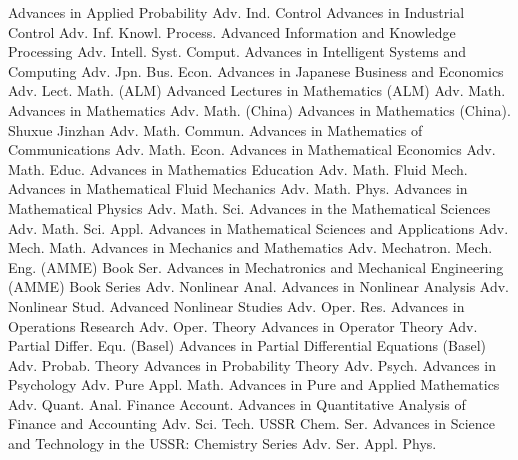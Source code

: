 {Advances in Applied Probability}
{Adv. Ind. Control}
{Advances in Industrial Control}
{Adv. Inf. Knowl. Process.}
{Advanced Information and Knowledge Processing}
{Adv. Intell. Syst. Comput.}
{Advances in Intelligent Systems and Computing}
{Adv. Jpn. Bus. Econ.}
{Advances in Japanese Business and Economics}
{Adv. Lect. Math. (ALM)}
{Advanced Lectures in Mathematics (ALM)}
{Adv. Math.}
{Advances in Mathematics}
{Adv. Math. (China)}
{Advances in Mathematics (China). Shuxue Jinzhan}
{Adv. Math. Commun.}
{Advances in Mathematics of Communications}
{Adv. Math. Econ.}
{Advances in Mathematical Economics}
{Adv. Math. Educ.}
{Advances in Mathematics Education}
{Adv. Math. Fluid Mech.}
{Advances in Mathematical Fluid Mechanics}
{Adv. Math. Phys.}
{Advances in Mathematical Physics}
{Adv. Math. Sci.}
{Advances in the Mathematical Sciences}
{Adv. Math. Sci. Appl.}
{Advances in Mathematical Sciences and Applications}
{Adv. Mech. Math.}
{Advances in Mechanics and Mathematics}
{Adv. Mechatron. Mech. Eng. (AMME) Book Ser.}
{Advances in Mechatronics and Mechanical Engineering (AMME) Book Series}
{Adv. Nonlinear Anal.}
{Advances in Nonlinear Analysis}
{Adv. Nonlinear Stud.}
{Advanced Nonlinear Studies}
{Adv. Oper. Res.}
{Advances in Operations Research}
{Adv. Oper. Theory}
{Advances in Operator Theory}
{Adv. Partial Differ. Equ. (Basel)}
{Advances in Partial Differential Equations (Basel)}
{Adv. Probab. Theory}
{Advances in Probability Theory}
{Adv. Psych.}
{Advances in Psychology}
{Adv. Pure Appl. Math.}
{Advances in Pure and Applied Mathematics}
{Adv. Quant. Anal. Finance Account.}
{Advances in Quantitative Analysis of Finance and Accounting}
{Adv. Sci. Tech. USSR Chem. Ser.}
{Advances in Science and Technology in the USSR: Chemistry Series}
{Adv. Ser. Appl. Phys.}
